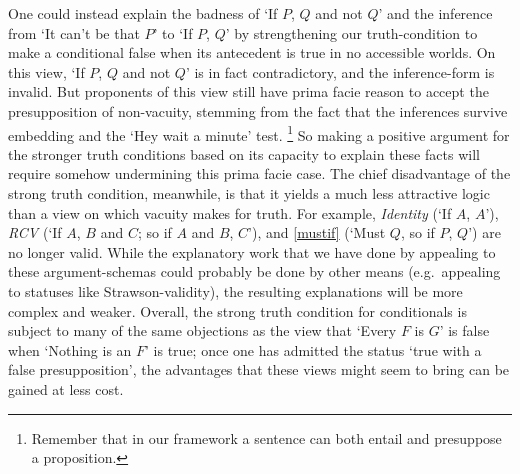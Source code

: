 \documentclass[If.tex]{subfiles}
\begin{document}
One could instead explain the badness of ‘If $P$, $Q$ and not $Q$’ and the inference from ‘It can't be that $P$’ to ‘If $P$, $Q$’ by strengthening our truth-condition to make a conditional false when its antecedent is true in no accessible worlds.  On this view, ‘If $P$, $Q$ and not $Q$’ is in fact contradictory, and the inference-form is invalid.  But proponents of this view still have prima facie reason to accept the presupposition of non-vacuity, stemming from the fact that the inferences survive embedding and the ‘Hey wait a minute’ test.%
\footnote{Remember that in our framework a sentence can both entail and presuppose a proposition.}   
So making a positive argument for the stronger truth conditions based on its capacity to explain these facts will require somehow undermining this prima facie case.  The chief disadvantage of the strong truth condition, meanwhile, is that it yields a much less attractive logic than a view on which vacuity makes for truth.  For example, \emph{Identity} (‘If $A$, $A$’), \emph{RCV} (‘If $A$, $B$ and $C$; so if $A$ and $B$, $C$’), and \ref{mustif} (‘Must $Q$, so if $P$, $Q$’) are no longer valid.  While the explanatory work that we have done by appealing to these argument-schemas could probably be done by other means (e.g.\ appealing to statuses like Strawson-validity), the resulting explanations will be more complex and weaker.  Overall, the strong truth condition for conditionals is subject to many of the same objections as the view that ‘Every $F$ is $G$’ is false when ‘Nothing is an $F$’ is true; once one has admitted the status ‘true with a false presupposition’, the advantages that these views might seem to bring can be gained at less cost.  
\end{document}
